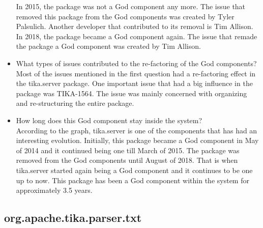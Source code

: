 \documentclass{article}
\begin{document}
\begin{itemize}
    In 2015, the package was not a God component any more. The issue that removed this package from the God components was created by Tyler Palsulich. Another developer that contributed to its removal is Tim Allison. In 2018, the package became a God component again. The issue that remade the package a God component was created by Tim Allison. %


    \item What types of issues contributed to the re-factoring of the God components?\\
    Most of the issues mentioned in the first question had a re-factoring effect in the tika.server package. One important issue that had a big influence in the package was TIKA-1564. The issue was mainly concerned with organizing and re-structuring the entire package.
    \item  How long does this God component stay inside the system?\\
    According to the graph, tika.server is one of the components that has had an interesting evolution. Initially, this package became a God component in May of 2014 and it continued being one till March of 2015. The package was removed from the God components until August of 2018. That is when tika.server started again being a God component and it continues to be one up to now. This package has been a God component within the system for approximately 3.5 years.
\end{itemize}


\subsection{org.apache.tika.parser.txt}
\end{document}
